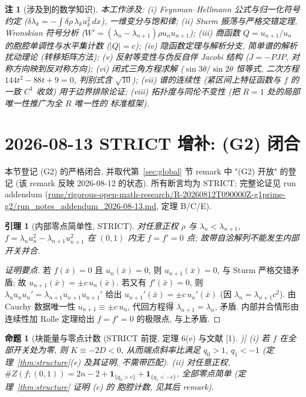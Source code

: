 \documentclass[UTF8]{ctexart}
\newtheorem{proposition}[theorem]{命题}
\newtheorem{lemma}[theorem]{引理}
\newtheorem{remark}[theorem]{注}
\begin{document}
\begin{remark}[涉及到的数学知识]
本工作涉及: (i) Feynman--Hellmann 公式与归一化符号约定
($\delta\lambda_k=-\int\delta\rho\,\lambda_ku_k^2\,dx$), 一维变分与饱和律;
(ii) Sturm 振荡与严格交错定理, Wronskian 符号分析 ($W'=(\lambda_n-\lambda_{n+1})\rho u_nu_{n+1}$);
(iii) 商函数 $Q=u_{n+1}/u_n$ 的胞腔单调性与水平集计数 ($|Q|=c$);
(iv) 隐函数定理与解析分支, 简单谱的解析扰动理论 (转移矩阵方法);
(v) 反射等变性与伪反自伴 Jacobi 结构 ($J=-PJP$, 对称方向映到反对称方向);
(vi) 闭式三角方程求解 ($\sin3\theta/\sin2\theta$ 恒等式, 二次方程
$144t^2-88t+9=0$, 判别式含 $\sqrt{10}$);
(vii) 谱的连续性 (紧区间上特征函数与 $f$ 的一致 $C^1$ 收敛) 用于边界排除论证;
(viii) 拓扑度与同伦不变性 (把 $R=1$ 处的局部唯一性推广为全 $R$ 唯一性的
标准框架).
\end{remark}


\section{2026-08-13 STRICT 增补: (G2) 闭合}\label{sec:g2closed}

本节登记 (G2) 的严格闭合, 并取代第~\ref{sec:global} 节 remark 中 "(G2) 开放"
的登记 (该 remark 反映 2026-08-12 的状态). 所有断言均为 STRICT; 完整论证见
run addendum (\url{runs/rigorous-open-math-research/R-20260812T090000Z-g1prime-g2/run_notes_addendum_2026-08-13.md}, 定理 B/C/E).

\begin{lemma}[内部零点简单性, STRICT]\label{lem:simplez}
对任意正权 $\rho$ 与 $\lambda_n<\lambda_{n+1}$,
$f=\lambda_nu_n^2-\lambda_{n+1}u_{n+1}^2$ 在 $(0,1)$ 内无
$f=f'=0$ 点; 故带自洽解列不能发生内部开关并合.
\end{lemma}

\begin{proof}[证明要点]
若 $f(\bar x)=0$ 且 $u_n(\bar x)=0$, 则 $u_{n+1}(\bar x)=0$, 与 Sturm 严格交错矛盾;
故 $u_{n+1}(\bar x)=\pm c\,u_n(\bar x)$. 若又有 $f'(\bar x)=0$, 则
$\lambda_nu_nu_n'=\lambda_{n+1}u_{n+1}u_{n+1}'$ 给出
$u_{n+1}'(\bar x)=\pm c\,u_n'(\bar x)$ (因 $\lambda_n=\lambda_{n+1}c^2$).
由 Cauchy 数据唯一性 $u_{n+1}\equiv\pm c\,u_n$, 代回方程得
$\lambda_{n+1}=\lambda_n$, 矛盾. 内部并合情形由连续性加 Rolle 定理给出
$f=f'=0$ 的极限点, 与上矛盾.
\end{proof}

\begin{proposition}[块能量与零点计数 (STRICT 前提, 定理 6(e) 与文献 [1])]
(i) 若 $f$ 在全部开关处为零, 则 $K\equiv-2D<0$, 从而端点斜率比满足
$q_0>1$, $q_1<-1$ (定理~\ref{thm:structure}(e) 及其证明, 不需带匹配).
(ii) 对任意正权, $\#Z(f;(0,1))=2n-2+\mathbf1_{\{q_0>c\}}
+\mathbf1_{\{q_1<-c\}}$, 全部零点简单 (定理~\ref{thm:structure} 证明 (c) 的
胞腔计数, 见其后 remark).
\end{proposition}
\end{document}
